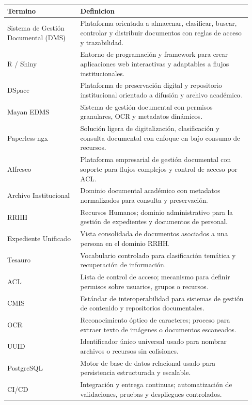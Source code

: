\begin{longtable}{p{} p{}}
\toprule
\textbf{Termino} & \textbf{Definicion} \\
\midrule
Sistema de Gestión Documental (DMS) & Plataforma orientada a almacenar, clasificar, buscar, controlar y distribuir documentos con reglas de acceso y trazabilidad. \\
R / Shiny & Entorno de programación y framework para crear aplicaciones web interactivas y adaptables a flujos institucionales. \\
DSpace & Plataforma de preservación digital y repositorio institucional orientado a difusión y archivo académico. \\
Mayan EDMS & Sistema de gestión documental con permisos granulares, OCR y metadatos dinámicos. \\
Paperless-ngx & Solución ligera de digitalización, clasificación y consulta documental con enfoque en bajo consumo de recursos. \\
Alfresco & Plataforma empresarial de gestión documental con soporte para flujos complejos y control de acceso por ACL. \\
Archivo Institucional & Dominio documental académico con metadatos normalizados para consulta y preservación. \\
RRHH & Recursos Humanos; dominio administrativo para la gestión de expedientes y documentos de personal. \\
Expediente Unificado & Vista consolidada de documentos asociados a una persona en el dominio RRHH. \\
Tesauro & Vocabulario controlado para clasificación temática y recuperación de información. \\
ACL & Lista de control de acceso; mecanismo para definir permisos sobre usuarios, grupos o recursos. \\
CMIS & Estándar de interoperabilidad para sistemas de gestión de contenido y repositorios documentales. \\
OCR & Reconocimiento óptico de caracteres; proceso para extraer texto de imágenes o documentos escaneados. \\
UUID & Identificador único universal usado para nombrar archivos o recursos sin colisiones. \\
PostgreSQL & Motor de base de datos relacional usado para persistencia estructurada y escalable. \\
CI/CD & Integración y entrega continuas; automatización de validaciones, pruebas y despliegues controlados. \\

\end{longtable}
